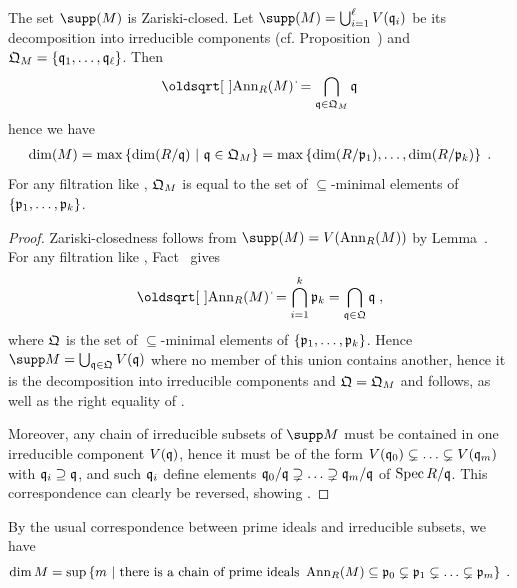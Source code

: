 \documentclass[a4paper,parskip=half,numbers=enddot, DIV=12]{scrreprt}
\begin{document}
\begin{fact}
    The set $\supp(M)$ is Zariski-closed. Let $\supp(M) = \bigcup_{i=1}^\ell V(\qq_i)$ be its decomposition into irreducible components (cf. Proposition~) and $\mathfrak{Q}_M= \left\{\mathfrak{q}_1,\ldots,\mathfrak{q}_\ell\right\}$. Then 
    \begin{align}
        \sqrt{\Ann_R(M)} = \bigcap_{\qq\in \QQ_M} \qq  \lbl{eq:sqrtAnnCap}
    \end{align}
    hence we have
    \begin{align}
        \dim (M) = \max \left\{\dim(R/\qq)\st \qq\in \QQ_M\right\}=\max\left\{\dim(R/\pp_1),\ldots,\dim(R/\pp_k)\right\}\;.\lbl{eq:dimSuppM}
    \end{align}
    For any filtration like , $\mathfrak{Q}_M$ is equal to the set of $\subseteq$-minimal elements of $\left\{\mathfrak{p}_1,\ldots,\mathfrak{p}_k\right\}$.
\end{fact}
\begin{proof}
    Zariski-closedness follows from $\supp(M) = V(\Ann_R(M))$ by Lemma~. For any filtration like , Fact~ gives 
    \begin{align*}
    	\sqrt{\Ann_R(M)}  =\bigcap_{i=1}^k \pp_k = \bigcap_{\qq\in\QQ} \qq\;,
    \end{align*}
    where $\mathfrak{Q}$ is the set of $\subseteq$-minimal elements of $\left\{\mathfrak{p}_1,\ldots,\mathfrak{p}_k\right\}$. Hence $\supp M=\bigcup_{\qq\in \QQ} V(\qq)$ where no member of this union contains another, hence it is the decomposition into irreducible components and $\mathfrak{Q}= \mathfrak{Q}_M$ and  follows, as well as the right equality of . 
    
    Moreover, any chain of irreducible subsets of $\supp M$ must be contained in one irreducible component $V(\mathfrak{q})$, hence it must be of the form $V(\mathfrak{q}_0)\subsetneq \ldots\subsetneq V(\mathfrak{q}_m)$ with $\mathfrak{q}_i\supseteq \mathfrak{q}$, and such $\mathfrak{q}_i$ define elements $\mathfrak{q}_0/\mathfrak{q}\supsetneq\ldots\supsetneq\mathfrak{q}_m/\mathfrak{q}$ of $\operatorname{Spec} R/\mathfrak{q}$. This correspondence can clearly be reversed, showing .
\end{proof}
\begin{rem*}
    By the usual correspondence between prime ideals and irreducible subsets, we have
    \begin{align}
        \dim M = \sup\left\{m\st \text{there is a chain of prime ideals } \Ann_R(M) \subseteq \pp_0\subsetneq \pp_1\subsetneq \ldots \subsetneq \pp_m\right\}\;. \lbl{eq:dimChainAnn}
    \end{align}
\end{rem*}
\end{document}
